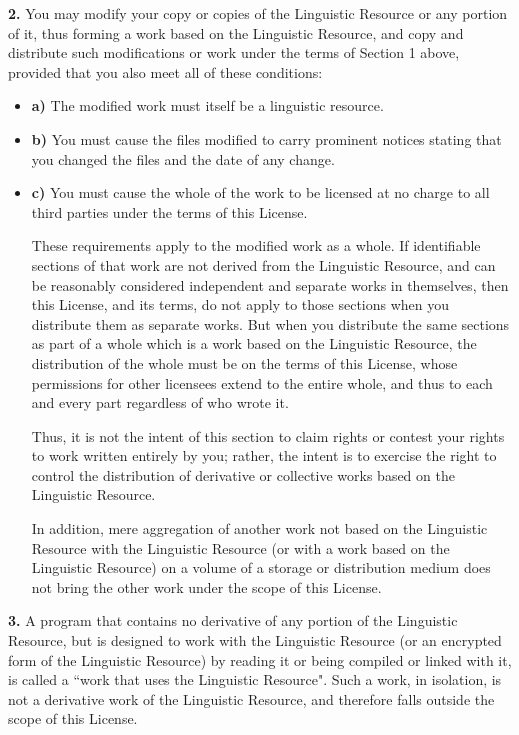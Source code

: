 \documentclass[10pt]{article}
\begin{document}
\vspace{5pt}\noindent
{\bf 2.}
You may modify your copy or copies of the Linguistic Resource or any portion of it, thus forming a work based on the Linguistic Resource, and copy and distribute such modifications or work under the terms of Section 1 above, provided that you also meet all of these conditions:
\begin{itemize}
\item {\bf a)} The modified work must itself be a linguistic resource.
\item {\bf b)} You must cause the files modified to carry prominent notices stating that you changed the files and the date of any change. 
\item {\bf c)} You must cause the whole of the work to be licensed at no charge to all third parties under the terms of this License. 

\vspace{5pt}\noindent
These requirements apply to the modified work as a whole. If identifiable sections of that work are not derived from the Linguistic Resource, and can be reasonably considered independent and separate works in themselves, then this License, and its terms, do not apply to those sections when you distribute them as separate works. But when you distribute the same sections as part of a whole which is a work based on the Linguistic Resource, the distribution of the whole must be on the terms of this License, whose permissions for other licensees extend to the entire whole, and thus to each and every part regardless of who wrote it.

\vspace{5pt}\noindent
Thus, it is not the intent of this section to claim rights or contest your rights to work written entirely by you; rather, the intent is to exercise the right to control the distribution of derivative or collective works based on the Linguistic Resource.

\vspace{5pt}\noindent
In addition, mere aggregation of another work not based on the Linguistic Resource with the Linguistic Resource (or with a work based on the Linguistic Resource) on a volume of a storage or distribution medium does not bring the other work under the scope of this License.
\end{itemize}

\vspace{5pt}\noindent
{\bf 3.}
A program that contains no derivative of any portion of the Linguistic Resource, but is designed to work with the Linguistic Resource (or an encrypted form of the Linguistic Resource) by reading it or being compiled or linked with it, is called a ``work that uses the Linguistic Resource". Such a work, in isolation, is not a derivative work of the Linguistic Resource, and therefore falls outside the scope of this License.
\end{document}
